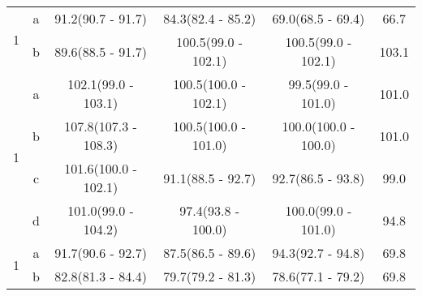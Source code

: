 \begin{table}[H]
\begin{tabular}{c|c|c|c|c|c}
\multirow{2}{*}{1} & a & 91.2(90.7 - 91.7) & 84.3(82.4 - 85.2) & 69.0(68.5 - 69.4) & 66.7\\ 
 & b & 89.6(88.5 - 91.7) & 100.5(99.0 - 102.1) & 100.5(99.0 - 102.1) & 103.1\\ 
\hline

\multirow{4}{*}{1} & a & 102.1(99.0 - 103.1) & 100.5(100.0 - 102.1) & 99.5(99.0 - 101.0) & 101.0\\ 
 & b & 107.8(107.3 - 108.3) & 100.5(100.0 - 101.0) & 100.0(100.0 - 100.0) & 101.0\\ 
 & c & 101.6(100.0 - 102.1) & 91.1(88.5 - 92.7) & 92.7(86.5 - 93.8) & 99.0\\ 
 & d & 101.0(99.0 - 104.2) & 97.4(93.8 - 100.0) & 100.0(99.0 - 101.0) & 94.8\\ 
\hline

\multirow{2}{*}{1} & a & 91.7(90.6 - 92.7) & 87.5(86.5 - 89.6) & 94.3(92.7 - 94.8) & 69.8\\ 
 & b & 82.8(81.3 - 84.4) & 79.7(79.2 - 81.3) & 78.6(77.1 - 79.2) & 69.8\\ 
\hline
		
		\hline




		\hline
		
	\end{tabular}
	\label{tab:resultsComplex}
\end{table}


